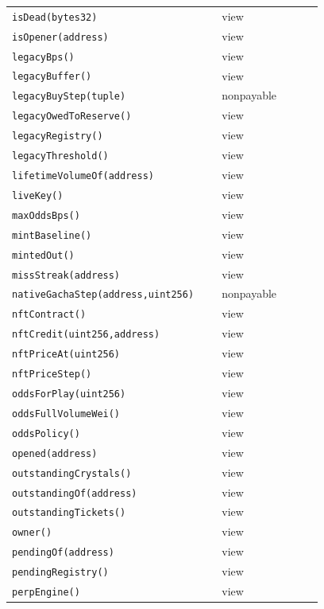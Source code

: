 \begin{longtable}{@{}p{0.62\linewidth}p{0.30\linewidth}@{}}
\texttt{\scriptsize isDead(bytes32)} & view \\
\texttt{\scriptsize isOpener(address)} & view \\
\texttt{\scriptsize legacyBps()} & view \\
\texttt{\scriptsize legacyBuffer()} & view \\
\texttt{\scriptsize legacyBuyStep(tuple)} & nonpayable \\
\texttt{\scriptsize legacyOwedToReserve()} & view \\
\texttt{\scriptsize legacyRegistry()} & view \\
\texttt{\scriptsize legacyThreshold()} & view \\
\texttt{\scriptsize lifetimeVolumeOf(address)} & view \\
\texttt{\scriptsize liveKey()} & view \\
\texttt{\scriptsize maxOddsBps()} & view \\
\texttt{\scriptsize mintBaseline()} & view \\
\texttt{\scriptsize mintedOut()} & view \\
\texttt{\scriptsize missStreak(address)} & view \\
\texttt{\scriptsize nativeGachaStep(address,uint256)} & nonpayable \\
\texttt{\scriptsize nftContract()} & view \\
\texttt{\scriptsize nftCredit(uint256,address)} & view \\
\texttt{\scriptsize nftPriceAt(uint256)} & view \\
\texttt{\scriptsize nftPriceStep()} & view \\
\texttt{\scriptsize oddsForPlay(uint256)} & view \\
\texttt{\scriptsize oddsFullVolumeWei()} & view \\
\texttt{\scriptsize oddsPolicy()} & view \\
\texttt{\scriptsize opened(address)} & view \\
\texttt{\scriptsize outstandingCrystals()} & view \\
\texttt{\scriptsize outstandingOf(address)} & view \\
\texttt{\scriptsize outstandingTickets()} & view \\
\texttt{\scriptsize owner()} & view \\
\texttt{\scriptsize pendingOf(address)} & view \\
\texttt{\scriptsize pendingRegistry()} & view \\
\texttt{\scriptsize perpEngine()} & view \\

\end{longtable}
